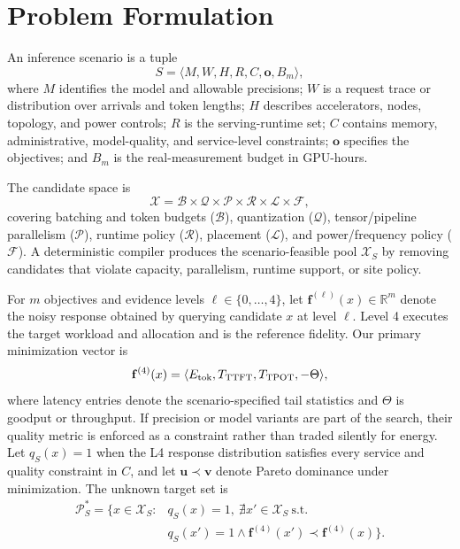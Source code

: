 \section{Problem Formulation}

An inference scenario is a tuple
\begin{equation}
S=\langle M,W,H,R,C,\mathbf o,B_m\rangle,
\end{equation}
where $M$ identifies the model and allowable precisions; $W$ is a request
trace or distribution over arrivals and token lengths; $H$ describes
accelerators, nodes, topology, and power controls; $R$ is the serving-runtime
set; $C$ contains memory, administrative, model-quality, and service-level
constraints;
$\mathbf o$ specifies the objectives; and $B_m$ is the real-measurement budget
in GPU-hours.

The candidate space is
\begin{equation}
\mathcal X=\mathcal B\!\times\!\mathcal Q\!\times\!\mathcal P\!\times\!
\mathcal R\!\times\!\mathcal L\!\times\!\mathcal F,
\end{equation}
covering batching and token budgets ($\mathcal B$), quantization
($\mathcal Q$), tensor/pipeline parallelism ($\mathcal P$), runtime policy
($\mathcal R$), placement ($\mathcal L$), and power/frequency policy
($\mathcal F$).  A deterministic compiler produces the scenario-feasible pool
$\mathcal X_S$ by removing candidates that violate capacity, parallelism,
runtime support, or site policy.

For $m$ objectives and evidence levels $\ell\in\{0,\ldots,4\}$, let
$\mathbf f^{(\ell)}(x)\in\mathbb R^m$ denote the noisy response obtained by
querying candidate $x$ at level $\ell$.  Level 4 executes the target workload
and allocation and is the reference fidelity.  Our primary minimization vector
is
\begin{equation}
\mathbf f^{(4)}(x)=
\langle E_{\rm tok},T_{\rm TTFT},T_{\rm TPOT},-\Theta\rangle,
\end{equation}
where latency entries denote the scenario-specified tail statistics and
$\Theta$ is goodput or throughput.  If precision or model variants are part of
the search, their quality metric is enforced as a constraint rather than traded
silently for energy.  Let $q_S(x)=1$ when the L4 response distribution
satisfies every service and quality constraint in $C$, and let
$\mathbf u\prec\mathbf v$
denote Pareto dominance under minimization.  The unknown target set is
\begin{align}
\mathcal P_S^*=\{x\in\mathcal X_S:
&q_S(x)=1,\ \nexists x'\in\mathcal X_S\ \text{s.t.}\nonumber\\[-2pt]
&q_S(x')=1\land
\mathbf f^{(4)}(x')\prec\mathbf f^{(4)}(x)\}.
\label{eq:true-frontier}
\end{align}

